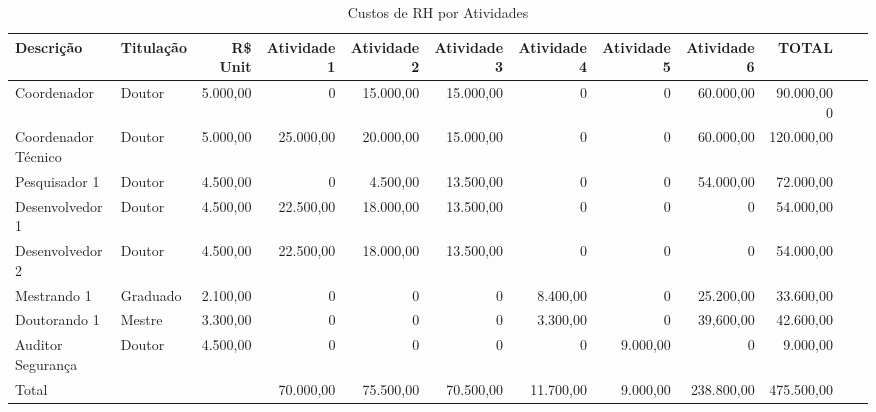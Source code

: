\documentclass[a4paper,oneside,portuguese,11pt]{article}
\begin{document}
\begin{table}[ht!]
\centering 
 \caption{Custos de RH por Atividades}
\label{tab:custo}
\begin{adjustbox}{max width=.95\textwidth}

\begin{tabular}{llrrrrrrrrrr}
\hline
Descrição & Titulação & R\$ Unit & Atividade 1 &Atividade 2 &Atividade 3 & Atividade 4 &Atividade 5 & Atividade 6 & TOTAL\\
\hline
Coordenador & Doutor& 5.000,00 & 0 &15.000,00 &15.000,00 & 0 &0 & 60.000,00& 90.000,00 0\\
Coordenador Técnico&Doutor & 5.000,00 & 25.000,00 &20.000,00 &15.000,00 & 0 &0 & 60.000,00& 120.000,00 \\
Pesquisador 1 &Doutor& 4.500,00 & 0&4.500,00 &13.500,00 & 0 &0 & 54.000,00& 72.000,00 \\
Desenvolvedor 1 &Doutor& 4.500,00 & 22.500,00 &18.000,00 &13.500,00 & 0 &0 & 0& 54.000,00 \\
Desenvolvedor 2 &Doutor& 4.500,00 & 22.500,00 &18.000,00 &13.500,00 & 0 &0 & 0& 54.000,00 \\
Mestrando 1  &Graduado& 2.100,00 & 0 &0 &0 & 8.400,00 &0 & 25.200,00& 33.600,00 \\
Doutorando 1 &Mestre& 3.300,00 & 0 &0 &0 & 3.300,00 &0 & 39,600,00& 42.600,00 \\
Auditor Segurança &Doutor& 4.500,00 & 0 &0 &0 & 0 &9.000,00 & 0& 9.000,00 \\
Total &  & & 70.000,00 & 75.500,00 & 70.500,00& 11.700,00 &9.000,00 & 238.800,00 & 475.500,00 \\
\hline
\end{tabular}
\end{adjustbox}
\end{table}


\newpage



\newpage


%


\newpage




%

\end{document}
